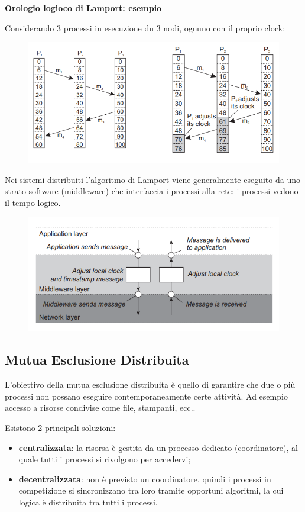 \documentclass{article}
\begin{document}
\vspace{3mm}
\textbf{Orologio logioco di Lamport: esempio}

Considerando 3 processi in esecuzione du 3 nodi, ognuno con il proprio clock:

\begin{figure}[htbp]
    \centering
    \includegraphics[width=0.50\columnwidth]{imgs/lamport.PNG}
\end{figure}

\vspace{5mm}
Nei sistemi distribuiti l'algoritmo di Lamport viene generalmente eseguito da uno strato software (middleware) che interfaccia i processi alla rete: i processi vedono il tempo logico.
\begin{figure}[htbp]
    \centering
    \includegraphics[width=0.60\columnwidth]{imgs/lamport2.PNG}
\end{figure}

\subsection{Mutua Esclusione Distribuita}
L'obiettivo della mutua esclusione distribuita è quello di garantire che due o più processi non possano eseguire contemporaneamente certe attività. Ad esempio accesso a risorse
condivise come file, stampanti, ecc..

\vspace{3mm}
Esistono 2 principali soluzioni:
\begin{itemize}
    \item \textbf{centralizzata}: la risorsa è gestita da un processo dedicato (coordinatore), al quale tutti i processi si rivolgono per accedervi;
    \item \textbf{decentralizzata}: non è previsto un coordinatore, quindi i processi in competizione si sincronizzano tra loro tramite opportuni algoritmi, la cui logica è
    distribuita tra tutti i processi.
\end{itemize}
\end{document}
